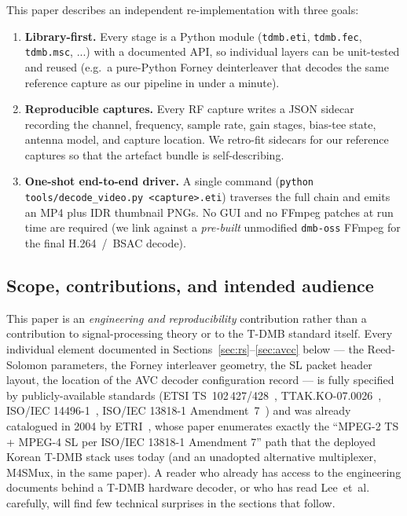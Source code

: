 \documentclass[11pt,a4paper]{article}
\begin{document}
This paper describes an independent re-implementation with three goals:
\begin{enumerate}[leftmargin=*,nosep]
\item \textbf{Library-first.}  Every stage is a Python module
       (\texttt{tdmb.eti}, \texttt{tdmb.fec}, \texttt{tdmb.msc}, ...) with a
       documented API, so individual layers can be unit-tested and reused
       (e.g.\ a pure-Python Forney deinterleaver that decodes the same
       reference capture as our pipeline in under a minute).
\item \textbf{Reproducible captures.}  Every RF capture writes a JSON
       sidecar recording the channel, frequency, sample rate, gain stages,
       bias-tee state, antenna model, and capture location.  We retro-fit
       sidecars for our reference captures so that the artefact bundle is
       self-describing.
\item \textbf{One-shot end-to-end driver.}  A single command
       (\texttt{python tools/decode\_video.py <capture>.eti}) traverses
       the full chain and emits an MP4 plus IDR thumbnail PNGs.  No GUI
       and no FFmpeg patches at run time are required (we link against a
       \emph{pre-built} unmodified \texttt{dmb-oss} FFmpeg for the final
       H.264~/~BSAC decode).
\end{enumerate}

\subsection{Scope, contributions, and intended audience}
This paper is an \emph{engineering and reproducibility} contribution
rather than a contribution to signal-processing theory or to the
T-DMB standard itself.  Every individual element documented in
Sections~\ref{sec:rs}--\ref{sec:avcc} below --- the Reed-Solomon
parameters, the Forney interleaver geometry, the SL packet header
layout, the location of the AVC decoder configuration record ---
is fully specified by publicly-available standards (ETSI
TS~102\,427/428~\cite{etsi102427,etsi102428},
TTAK.KO-07.0026~\cite{ttak0026}, ISO/IEC
14496-1~\cite{iso14496-1}, ISO/IEC 13818-1
Amendment~7~\cite{iso13818-1-amd7}) and was already catalogued
in 2004 by ETRI~\cite{lee2004m4smux}, whose paper enumerates
exactly the ``MPEG-2 TS + MPEG-4 SL per ISO/IEC 13818-1 Amendment
7'' path that the deployed Korean T-DMB stack uses today (and an
unadopted alternative multiplexer, M4SMux, in the same paper).
A reader who already has access to the engineering documents
behind a T-DMB hardware decoder, or who has read
Lee~et~al.~\cite{lee2004m4smux} carefully, will find few
technical surprises in the sections that follow.
\end{document}
